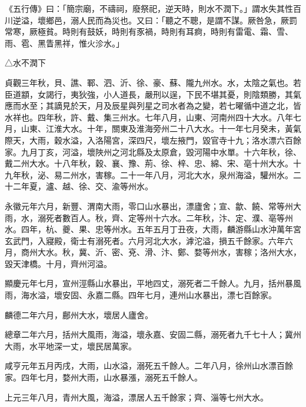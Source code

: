 
\begin{pinyinscope}

 《五行傳》曰：「簡宗廟，不禱祠，廢祭祀，逆天時，則水不潤下。」謂水失其性百川逆溢，壞鄉邑，溺人民而為災也。又曰：「聽之不聰，是謂不謀。厥咎急，厥罰常寒，厥極貧。時則有鼓妖，時則有豕禍，時則有耳痾，時則有雷電、霜、雪、雨、雹、黑眚黑祥，惟火沴水。」



 △水不潤下



 貞觀三年秋，貝、譙、鄆、泗、沂、徐、豪、蘇、隴九州水。水，太陰之氣也。若臣道顓，女謁行，夷狄強，小人道長，嚴刑以逞，下民不堪其憂，則陰類勝，其氣應而水至；其謫見於天，月及辰星與列星之司水者為之變，若七曜循中道之北，皆水祥也。四年秋，許、戴、集三州水。七年八月，山東、河南州四十大水。八年七月，山東、江淮大水。十年，關東及淮海旁州二十八大水。十一年七月癸未，黃氣際天，大雨，穀水溢，入洛陽宮，深四尺，壞左掖門，毀官寺十九；洛水漂六百餘家。九月丁亥，河溢，壞陜州之河北縣及太原倉，毀河陽中水單。十六年秋，徐、戴二州大水。十八年秋，穀、襄、豫、荊、徐、梓、忠、綿、宋、亳十州大水。十九年秋，泌、易二州水，害稼。二十一年八月，河北大水，泉州海溢，驩州水。二十二年夏，瀘、越、徐、交、渝等州水。



 永徽元年六月，新豐、渭南大雨，零口山水暴出，漂廬舍；宣、歙、饒、常等州大雨，水，溺死者數百人。秋，齊、定等州十六水。二年秋，汴、定、濮、亳等州水。四年，杭、夔、果、忠等州水。五年五月丁丑夜，大雨，麟游縣山水沖萬年宮玄武門，入寢殿，衛士有溺死者。六月河北大水，滹沱溢，損五千餘家。六年六月，商州大水。秋，冀、沂、密、兗、滑、汴、鄭、婺等州水，害稼；洛州大水，毀天津橋。十月，齊州河溢。



 顯慶元年七月，宣州涇縣山水暴出，平地四丈，溺死者二千餘人。九月，括州暴風雨，海水溢，壞安固、永嘉二縣。四年七月，連州山水暴出，漂七百餘家。



 麟德二年六月，鄜州大水，壞居人廬舍。



 總章二年六月，括州大風雨，海溢，壞永嘉、安固二縣，溺死者九千七十人；冀州大雨，水平地深一丈，壞民居萬家。



 咸亨元年五月丙戌，大雨，山水溢，溺死五千餘人。二年八月，徐州山水漂百餘家。四年七月，婺州大雨，山水暴漲，溺死五千餘人。



 上元三年八月，青州大風，海溢，漂居人五千餘家；齊、淄等七州大水。




\end{pinyinscope}
